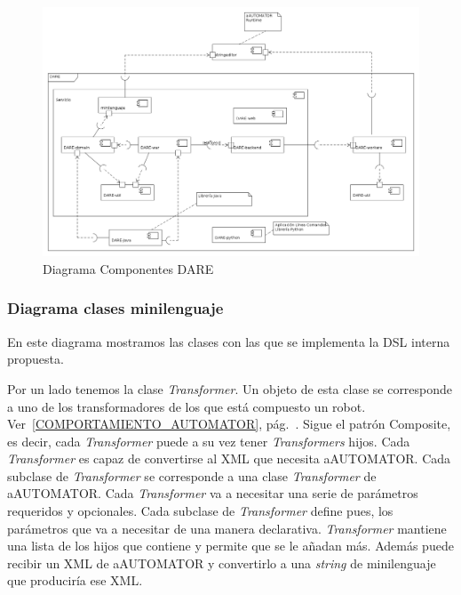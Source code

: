 \begin{landscape}
\begin{figure}[p]
\includegraphics[width=1.4\textwidth]{chapters/technical-manual/diagrams/diagrama_componentes.png}
\caption{Diagrama Componentes DARE}\label{diagrama_componentes_dare}
\end{figure}
\end{landscape}

\subsubsection{Diagrama clases minilenguaje}

En este diagrama mostramos las clases con las que se implementa la DSL
interna propuesta.

Por un lado tenemos la clase \emph{Transformer}. Un objeto de esta
clase se corresponde a uno de los transformadores de los que está
compuesto un robot. Ver~\ref{COMPORTAMIENTO_AUTOMATOR},
pág.~\pageref{COMPORTAMIENTO_AUTOMATOR}. Sigue el patrón
Composite\cite{COMPOSITE_PATTERN}, es decir, cada \emph{Transformer}
puede a su vez tener \emph{Transformers} hijos. Cada
\emph{Transformer} es capaz de convertirse al XML que necesita
aAUTOMATOR. Cada subclase de \emph{Transformer} se corresponde a una
clase \emph{Transformer} de aAUTOMATOR. Cada \emph{Transformer} va a
necesitar una serie de parámetros requeridos y opcionales. Cada
subclase de \emph{Transformer} define pues, los parámetros que va a
necesitar de una manera declarativa. \emph{Transformer} mantiene una
lista de los hijos que contiene y permite que se le añadan más. Además
puede recibir un XML de aAUTOMATOR y convertirlo a una \emph{string}
de minilenguaje que produciría ese XML.

